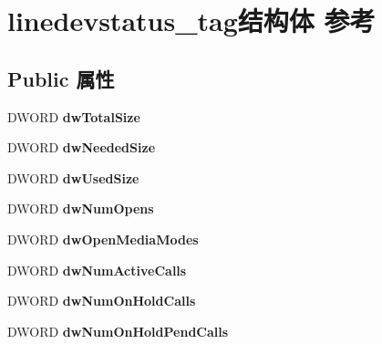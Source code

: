 \hypertarget{structlinedevstatus__tag}{}\section{linedevstatus\+\_\+tag结构体 参考}
\label{structlinedevstatus__tag}
\subsection*{Public 属性}
\begin{DoxyCompactItemize}
\item 
\mbox{\label{structlinedevstatus__tag_a993e3cd81ce5922664b8ad63c9934057}} 
D\+W\+O\+RD {\bfseries dw\+Total\+Size}
\item 
\mbox{\label{structlinedevstatus__tag_a7dc6a1e09463b78cc71eeb5e9f771cca}} 
D\+W\+O\+RD {\bfseries dw\+Needed\+Size}
\item 
\mbox{\label{structlinedevstatus__tag_ab060dcbfb113e4651e594cf5b1316d1e}} 
D\+W\+O\+RD {\bfseries dw\+Used\+Size}
\item 
\mbox{\label{structlinedevstatus__tag_a55367c4ebde4bb862e9fc56584f72775}} 
D\+W\+O\+RD {\bfseries dw\+Num\+Opens}
\item 
\mbox{\label{structlinedevstatus__tag_acb7b38d79b8c8eec35b7006aed320aca}} 
D\+W\+O\+RD {\bfseries dw\+Open\+Media\+Modes}
\item 
\mbox{\label{structlinedevstatus__tag_aba613f0b65023979f18816eabc2f69be}} 
D\+W\+O\+RD {\bfseries dw\+Num\+Active\+Calls}
\item 
\mbox{\label{structlinedevstatus__tag_a9e0c8d040108c9c4c5038f45a2402490}} 
D\+W\+O\+RD {\bfseries dw\+Num\+On\+Hold\+Calls}
\item 
\mbox{\label{structlinedevstatus__tag_a3da2cd0b620708ec835cec2df771090b}} 
D\+W\+O\+RD {\bfseries dw\+Num\+On\+Hold\+Pend\+Calls}
\item 
\mbox{\label{structlinedevstatus__tag_ad9e5d82745cce53699febefd206af476}} 

\end{DoxyCompactItemize}
